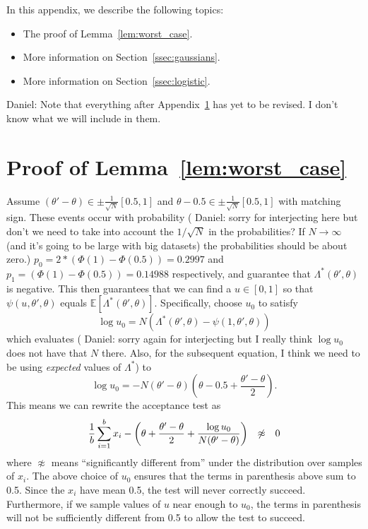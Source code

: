 \documentclass{article}
\begin{document}
In this appendix, we describe the following topics:

\begin{itemize}[noitemsep]
    \item The proof of Lemma~\ref{lem:worst_case}.
    \item More information on Section~\ref{ssec:gaussians}.
    \item More information on Section~\ref{ssec:logistic}.
\end{itemize}

{\color{blue} Daniel: Note that everything after
Appendix~\ref{app:worst_case_proof} has yet to be revised. I don't know what we
will include in them.}

\section{Proof of Lemma~\ref{lem:worst_case}}\label{app:worst_case_proof}

Assume $(\theta' - \theta) \in \pm\frac{1}{\sqrt{N}}[0.5,1]$ and $\theta -0.5
\in \pm\frac{1}{\sqrt{N}}[0.5,1]$ with matching sign. These events occur with
probability ({\color{blue} Daniel: sorry for interjecting here but don't we need
to take into account the $1/\sqrt{N}$ in the probabilities? If $N \to \infty$
(and it's going to be large with big datasets) the probabilities should be about
zero.}) $p_0=2*(\Phi(1)-\Phi(0.5)) = 0.2997$ and
$p_1=(\Phi(1)-\Phi(0.5))=0.14988$ respectively, and guarantee that
$\Lambda^*(\theta',\theta)$ is negative. This then guarantees that we can find a
$u \in [0,1]$ so that $\psi(u,\theta',\theta)$ equals
$\mathbb{E}[\Lambda^*(\theta',\theta)]$.  Specifically, choose $u_0$ to satisfy
\begin{equation}\label{eq:log_uo}
    \log u_0 = N(\Lambda^*(\theta',\theta)-\psi(1,\theta',\theta))
\end{equation}
which evaluates ({\color{blue} Daniel: sorry again for interjecting but I really
think $\log u_0$ does not have that $N$ there. Also, for the subsequent
equation, I think we need to be using \emph{expected} values of $\Lambda^*$}) to
\begin{equation}
    \log u_0 = -N(\theta'-\theta)\left(\theta-0.5+\frac{\theta'-\theta}{2}\right).
\end{equation}
This means we can rewrite the acceptance test as
\begin{equation}
    \frac{1}{b}\sum_{i=1}^b x_i-\left(\theta+\frac{\theta'-\theta}{2} + \frac{\log u_0}{N(\theta'-\theta)}\right)
    \hspace{0.1in} \not\approx \hspace{0.1in} 0
\end{equation}
where $\not\approx$ means ``significantly different from'' under the
distribution over samples of $x_i$.  The above choice of $u_0$ ensures that the
terms in parenthesis above sum to 0.5. Since the $x_i$ have mean 0.5, the test
will never correctly succeed.  Furthermore, if we sample values of $u$ near
enough to $u_0$, the terms in parenthesis will not be sufficiently different
from 0.5 to allow the test to succeed. 
  
\end{document}
